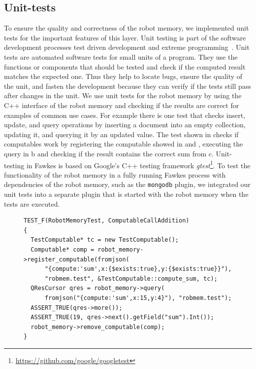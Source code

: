 \subsection{Unit-tests}
\label{sec:impl-unittests}
To ensure the quality and correctness of the robot memory, we
implemented unit tests for the important features of this layer. Unit
testing is part of the software development processes test driven
development and extreme programming~\cite{beck-test,beck-xp}. Unit
tests are automated software tests for small units of a program. They
use the functions or components that should be tested and check if the
computed result matches the expected one. Thus they help to locate
bugs, ensure the quality of the unit, and fasten the development
because they can verify if the tests still pass after changes in the
unit. We use unit tests for the robot memory by using the C++
interface of the robot memory and checking if the results are correct
for examples of common use cases. For example there is one test that
checks insert, update, and query operations by inserting a document
into an empty collection, updating it, and querying it by an updated
value. The test shown in  checks if computables work by registering the
computable showed in  and ,
executing the query in b and checking if the result
contains the correct sum from c. Unit-testing in Fawkes is based on Google's
C++ testing framework \emph{gtest}\footnote{\url{https://github.com/google/googletest}}. To test the functionality of the
robot memory in a fully running Fawkes process with dependencies of
the robot memory, such as the \texttt{mongodb} plugin, we integrated
our unit tests into a separate plugin that is started with the robot
memory when the tests are executed.
\begin{figure}
  \begin{lstlisting}[showlines,style=SmallCpp,
  caption={Unit test for registering and invoking a computable},
  label=lst:unit-test,
  emph={skill, args, state, target, res},
  emphstyle=\bfseries\color{green!80!black},
  emph={[2]\?skill, \$\?args, wait-for-lock, \?target, use,
  WAIT-FOR-LOCK, SKILL-EXECUTION, running},
  emphstyle={[2]\bfseries\color{blue!80!black}},
  morekeywords={retract, assert, modify, skill-call, skill-to-execute,
    wait-for-lock}]
TEST_F(RobotMemoryTest, ComputableCallAddition)
{
  TestComputable* tc = new TestComputable();
  Computable* comp = robot_memory->register_computable(fromjson(
      "{compute:'sum',x:{$exists:true},y:{$exists:true}}"),
      "robmem.test", &TestComputable::compute_sum, tc);
  QResCursor qres = robot_memory->query(
      fromjson("{compute:'sum',x:15,y:4}"), "robmem.test");
  ASSERT_TRUE(qres->more());
  ASSERT_TRUE(19, qres->next().getField("sum").Int());
  robot_memory->remove_computable(comp);
}
\end{lstlisting} %
\end{figure}

